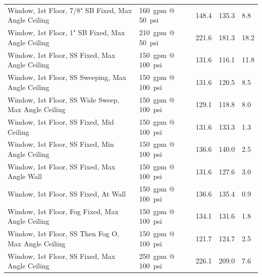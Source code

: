 \documentclass[12pt,oneside]{book}
\begin{document}
\begin{table}[!ht]
\begin{tabular}{lllll}
Window, 1st Floor, 7/8" SB Fixed, Max Angle Ceiling      & 160~gpm @ 50~psi               & 148.4                             & 135.3                              & 8.8                    \\
Window, 1st Floor, 1" SB Fixed, Max Angle Ceiling        & 210~gpm @ 50~psi               & 221.6                             & 181.3                              & 18.2                   \\
Window, 1st Floor, SS Fixed, Max Angle Ceiling           & 150~gpm @ 100~psi              & 131.6                             & 116.1                              & 11.8                   \\
Window, 1st Floor, SS Sweeping, Max Angle Ceiling        & 150~gpm @ 100~psi              & 131.6                             & 120.5                              & 8.5                    \\
Window, 1st Floor, SS Wide Sweep, Max Angle Ceiling      & 150~gpm @ 100~psi              & 129.1                             & 118.8                              & 8.0                    \\
Window, 1st Floor, SS Fixed, Mid Ceiling                 & 150~gpm @ 100~psi              & 131.6                             & 133.3                              & 1.3                    \\
Window, 1st Floor, SS Fixed, Min Angle Ceiling           & 150~gpm @ 100~psi              & 136.6                             & 140.0                              & 2.5                    \\
Window, 1st Floor, SS Fixed, Max Angle Wall              & 150~gpm @ 100~psi              & 131.6                             & 127.6                              & 3.0                    \\
Window, 1st Floor, SS Fixed, At Wall                     & 150~gpm @ 100~psi              & 136.6                             & 135.4                              & 0.9                    \\
Window, 1st Floor, Fog Fixed, Max Angle Ceiling          & 150~gpm @ 100~psi              & 134.1                             & 131.6                              & 1.8                    \\
Window, 1st Floor, SS Then Fog O, Max Angle Ceiling      & 150~gpm @ 100~psi              & 121.7                             & 124.7                              & 2.5                    \\
Window, 1st Floor, SS Fixed, Max Angle Ceiling           & 250~gpm @ 100~psi              & 226.1                             & 209.0                              & 7.6                    \\

\end{tabular}
\end{table}
\end{document}
